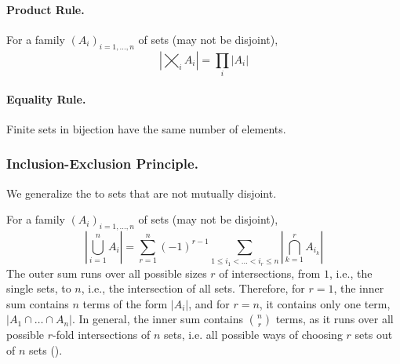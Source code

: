 \paragraph{Product Rule.} \label{par:product_rule}
For a family $(A_i)_{i=1,\dots,n}$ of sets (may not be disjoint), 
  \[
  \left|\bigtimes_i A_i\right| = \prod_i |A_i|
  \]

\paragraph{Equality Rule.} \label{par:equality_rule}
Finite sets in bijection have the same number of elements.

\subsubsection{Inclusion-Exclusion Principle.} \label{sec:inclusion_exclusion}
We generalize the  to sets that are not mutually disjoint.
\begin{theorem}\label{thm:inclusion_exclusion}
For a family $(A_i)_{i=1,\dots,n}$ of sets (may not be disjoint),
\begin{equation} \label{eq:inclusion_exclusion}
  \left|\bigcup_{i=1}^n A_i\right| = \sum_{r=1}^n (-1)^{r-1}
  \sum_{1\le i_1<\dots<i_r\le n} \left|\bigcap_{k=1}^r A_{i_k}\right| 
\end{equation}
The outer sum runs over all possible sizes \(r\) of intersections, from \(1\), i.e., the single sets, to \(n\), i.e., the intersection of all sets.
Therefore, for \(r=1\), the inner sum contains \(n\) terms of the form \(\left|A_i\right|\), and for \(r=n\), it contains only one term, \(\left|A_1 \cap \ldots \cap A_n\right|\).
In general, the inner sum contains \(\binom{n}{r}\) terms, as it runs over all possible $r$-fold intersections of $n$ sets, i.e. all possible ways of choosing \(r\) sets out of \(n\) sets ().
\end{theorem}
